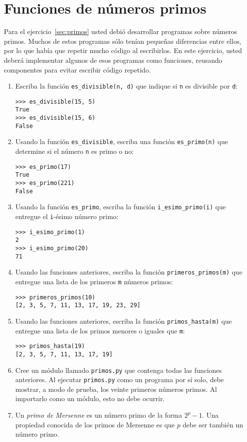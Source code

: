 \section{Funciones de números primos}

Para el ejercicio~\ref{sec:primos} usted debió
desarrollar programas sobre números primos.
Muchos de estos programas sólo tenían pequeñas diferencias entre ellos,
por lo que había que repetir mucho código al escribirlos. En este
ejercicio, usted deberá implementar algunos de esos programas como
funciones, reusando componentes para evitar escribir código
repetido.

\begin{enumerate}
\item
  Escriba la función \lstinline!es_divisible(n, d)! que indique si
  \lstinline!n! es divisible por \lstinline!d!:

\begin{lstlisting}
>>> es_divisible(15, 5)
True
>>> es_divisible(15, 6)
False
\end{lstlisting}
\item
  Usando la función \lstinline!es_divisible!, escriba una función
  \lstinline!es_primo(n)! que determine si el número \lstinline!n!
  es primo o no:

\begin{lstlisting}
>>> es_primo(17)
True
>>> es_primo(221)
False
\end{lstlisting}
\item
  Usando la función \lstinline!es_primo!, escriba la función
  \lstinline!i_esimo_primo(i)! que entregue el \lstinline!i!-ésimo número primo:

\begin{lstlisting}
>>> i_esimo_primo(1)
2
>>> i_esimo_primo(20)
71
\end{lstlisting}
\item
  Usando las funciones anteriores, escriba la función
  \lstinline!primeros_primos(m)! que entregue una lista de los primeros
  \lstinline!m! números primos:

\begin{lstlisting}
>>> primeros_primos(10)
[2, 3, 5, 7, 11, 13, 17, 19, 23, 29]
\end{lstlisting}
\item
  Usando las funciones anteriores, escriba la función
  \lstinline!primos_hasta(m)! que entregue una lista de los primos
  menores o iguales que \lstinline!m!:

\begin{lstlisting}
>>> primos_hasta(19)
[2, 3, 5, 7, 11, 13, 17, 19]
\end{lstlisting}
\item
  Cree un módulo llamado \lstinline!primos.py! que contenga todas las
  funciones ante\-rio\-res.
  Al ejecutar \lstinline!primos.py! como un programa por sí solo, debe
  mostrar, a modo de prueba, los veinte primeros números primos. Al
  importarlo como un módulo, esto no debe ocurrir.
\item
  Un \emph{primo de Mersenne} es un número primo de la forma \(2^p - 1\).
  Una propiedad conocida de los primos de Mersenne es que \(p\) debe ser
  también un número primo.


\end{enumerate}
